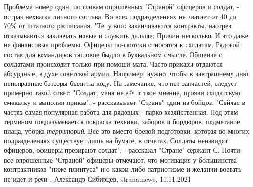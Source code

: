 Проблема номер один, по словам опрошенных "Страной" офицеров и солдат, - острая
нехватка личного состава. Во всех подразделениях не хватает от 40 до 70\% от
штатного расписания.  "Те, у кого заканчиваются контракты, наотрез отказываются
заключать новые и служить дальше. Причин несколько. И это даже не финансовые
проблемы. Офицеры по-скотски относятся к солдатам. Рядовой состав для
командиров тягловое быдло в буквальном смысле. Общение с солдатами происходит
только при помощи мата. Часто приказы отдаются абсурдные, в духе советской
армии. Например, нужно, чтобы к завтрашнему дню неисправные бэтээры были на
ходу. На замечание, что нет запчастей, следует примерно такой ответ: "Солдат,
меня не е@..т твое мнение, прояви солдатскую смекалку и выполни приказ", -
рассказывает "Стране" один из бойцов.  "Сейчас в частях самая популярная работа
для рядовых - парко-хозяйственная. Под этим термином подразумевается покраска
техники, заборов и бордюров, подметание плаца, уборка \emph{территорий}. Все это
вместо боевой подготовки, которая во многих подразделениях существует лишь на
бумаге, в отчетах. Солдаты ненавидят офицеров, офицеры презирают солдат", -
рассказал "Стране" сержант С.  Почти все опрошенные "Страной" офицеры отмечают,
что мотивация у большинства контрактников "ниже плинтуса" и о каком-либо
патриотизме и желании воевать не идет и речи
, 
Александр Сибирцев, strana.news, 11.11.2021


